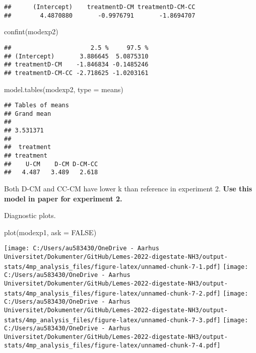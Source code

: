 \documentclass[
]{article}
\newenvironment{Shaded}{\begin{snugshade}}{\end{snugshade}}
\newcommand{\AttributeTok}[1]{\textcolor[rgb]{0.77,0.63,0.00}{#1}}
\newcommand{\ConstantTok}[1]{\textcolor[rgb]{0.00,0.00,0.00}{#1}}
\newcommand{\FunctionTok}[1]{\textcolor[rgb]{0.00,0.00,0.00}{#1}}
\newcommand{\NormalTok}[1]{#1}
\newcommand{\StringTok}[1]{\textcolor[rgb]{0.31,0.60,0.02}{#1}}
\begin{document}
\begin{verbatim}
##      (Intercept)    treatmentD-CM treatmentD-CM-CC 
##        4.4870880       -0.9976791       -1.8694707
\end{verbatim}

\begin{Shaded}
\begin{Highlighting}[]
\FunctionTok{confint}\NormalTok{(modexp2)}
\end{Highlighting}
\end{Shaded}

\begin{verbatim}
##                      2.5 %     97.5 %
## (Intercept)       3.886645  5.0875310
## treatmentD-CM    -1.846834 -0.1485246
## treatmentD-CM-CC -2.718625 -1.0203161
\end{verbatim}

\begin{Shaded}
\begin{Highlighting}[]
\FunctionTok{model.tables}\NormalTok{(modexp2, }\AttributeTok{type =} \StringTok{\textquotesingle{}means\textquotesingle{}}\NormalTok{)}
\end{Highlighting}
\end{Shaded}

\begin{verbatim}
## Tables of means
## Grand mean
##          
## 3.531371 
## 
##  treatment 
## treatment
##    U-CM    D-CM D-CM-CC 
##   4.487   3.489   2.618
\end{verbatim}

Both D-CM and CC-CM have lower k than reference in experiment 2.
\textbf{Use this model in paper for experiment 2.}

Diagnostic plots.

\begin{Shaded}
\begin{Highlighting}[]
\FunctionTok{plot}\NormalTok{(modexp1, }\AttributeTok{ask =} \ConstantTok{FALSE}\NormalTok{)}
\end{Highlighting}
\end{Shaded}

\texttt{[image: C:/Users/au583430/OneDrive - Aarhus Universitet/Dokumenter/GitHub/Lemes-2022-digestate-NH3/output-stats/4mp\_analysis\_files/figure-latex/unnamed-chunk-7-1.pdf]}
\texttt{[image: C:/Users/au583430/OneDrive - Aarhus Universitet/Dokumenter/GitHub/Lemes-2022-digestate-NH3/output-stats/4mp\_analysis\_files/figure-latex/unnamed-chunk-7-2.pdf]}
\texttt{[image: C:/Users/au583430/OneDrive - Aarhus Universitet/Dokumenter/GitHub/Lemes-2022-digestate-NH3/output-stats/4mp\_analysis\_files/figure-latex/unnamed-chunk-7-3.pdf]}
\texttt{[image: C:/Users/au583430/OneDrive - Aarhus Universitet/Dokumenter/GitHub/Lemes-2022-digestate-NH3/output-stats/4mp\_analysis\_files/figure-latex/unnamed-chunk-7-4.pdf]}
\end{document}
